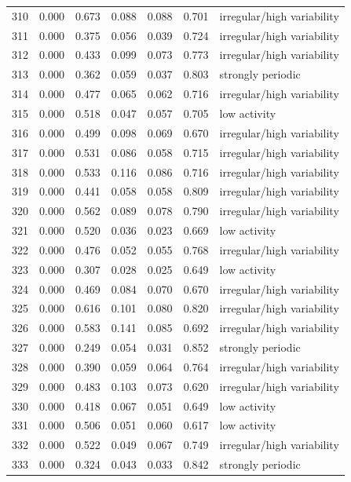 \begin{longtable}{lrrrrrl}
310 & 0.000 & 0.673 & 0.088 & 0.088 & 0.701 & irregular/high variability \\
311 & 0.000 & 0.375 & 0.056 & 0.039 & 0.724 & irregular/high variability \\
312 & 0.000 & 0.433 & 0.099 & 0.073 & 0.773 & irregular/high variability \\
313 & 0.000 & 0.362 & 0.059 & 0.037 & 0.803 & strongly periodic \\
314 & 0.000 & 0.477 & 0.065 & 0.062 & 0.716 & irregular/high variability \\
315 & 0.000 & 0.518 & 0.047 & 0.057 & 0.705 & low activity \\
316 & 0.000 & 0.499 & 0.098 & 0.069 & 0.670 & irregular/high variability \\
317 & 0.000 & 0.531 & 0.086 & 0.058 & 0.715 & irregular/high variability \\
318 & 0.000 & 0.533 & 0.116 & 0.086 & 0.716 & irregular/high variability \\
319 & 0.000 & 0.441 & 0.058 & 0.058 & 0.809 & irregular/high variability \\
320 & 0.000 & 0.562 & 0.089 & 0.078 & 0.790 & irregular/high variability \\
321 & 0.000 & 0.520 & 0.036 & 0.023 & 0.669 & low activity \\
322 & 0.000 & 0.476 & 0.052 & 0.055 & 0.768 & irregular/high variability \\
323 & 0.000 & 0.307 & 0.028 & 0.025 & 0.649 & low activity \\
324 & 0.000 & 0.469 & 0.084 & 0.070 & 0.670 & irregular/high variability \\
325 & 0.000 & 0.616 & 0.101 & 0.080 & 0.820 & irregular/high variability \\
326 & 0.000 & 0.583 & 0.141 & 0.085 & 0.692 & irregular/high variability \\
327 & 0.000 & 0.249 & 0.054 & 0.031 & 0.852 & strongly periodic \\
328 & 0.000 & 0.390 & 0.059 & 0.064 & 0.764 & irregular/high variability \\
329 & 0.000 & 0.483 & 0.103 & 0.073 & 0.620 & irregular/high variability \\
330 & 0.000 & 0.418 & 0.067 & 0.051 & 0.649 & low activity \\
331 & 0.000 & 0.506 & 0.051 & 0.060 & 0.617 & low activity \\
332 & 0.000 & 0.522 & 0.049 & 0.067 & 0.749 & irregular/high variability \\
333 & 0.000 & 0.324 & 0.043 & 0.033 & 0.842 & strongly periodic \\

\end{longtable}
